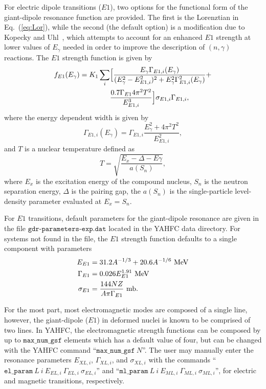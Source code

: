 \documentclass[
10pt,
showpacs,preprintnumbers,footinbib,
amsfonts,amsmath,amssymb,
aps,
prc,twocolumn,groupedaddress,superscriptaddress,
showkeys,
nofootinbib
]{revtex4-1}
\begin{document}
For electric dipole transitions ($E1$), two options for the functional form of the giant-dipole resonance function are provided. The first is the Lorenztian in Eq.~(\ref{eq:Lor}), while the second (the default option) is a modification due to Kopecky and Uhl~\cite{Kopecky:1990}, which attempts to account for an enhanced $E1$ strength at lower values of $E_\gamma$ needed in order to improve  the description of $(n,\gamma)$ reactions. The $E1$ strength function is given by
\begin{align}
f_{E1}(E_\gamma ) = K_1 \sum_i & \Bigl[ \frac{E_\gamma\Gamma_{E1,i}(E_\gamma)}{(E_\gamma^2 - E^2_{E1,i})^2+E^2_\gamma\Gamma^2_{E1,i}(E_\gamma)} +\notag\\
& \frac{0.7\Gamma_{E1}4\pi^2 T^2}{E_{E1,i}^3}\Bigr ]\sigma_{E1,i}\Gamma_{E1,i},
\end{align}
where the energy dependent width is given by
\begin{equation}
\Gamma_{E1,i}(E_\gamma) = \Gamma_{E1,i}\frac{ E_\gamma^2+4\pi^2T^2} {E^2_{E1,i}},
\end{equation} 
and $T$ is a nuclear temperature defined as
\begin{equation}
T = \sqrt{\frac{ E_x -\Delta - E\gamma} {a(S_n)}},
\end{equation}
where $E_x$ is the excitation energy of the compound nucleus, $S_n$ is the neutron separation energy, $\Delta$ is the pairing gap, the $a(S_n)$ is the single-particle level-density parameter evaluated at $E_x=S_n$.

For $E1$ transitions, default parameters for the giant-dipole resonance are given in the file ${\texttt{gdr-parameters-exp.dat}}$ located in the YAHFC data directory. For systems not found in the file, the $E1$ strength function defaults to a single component with parameters
\begin{align}
E_{E1} &= 31.2A^{-1/3} + 20.6A^{-1/6}~{\text{MeV}}  \\ \notag
\Gamma_{E1} &=  0.026E_{E1}^{1.91}~{\text{MeV}} \\ \notag
\sigma_{E1} &= \frac{144 N Z}{A\pi \Gamma_{E1}}~{\text{mb}}. 
\end{align}

For the most part, most electromagnetic modes are composed of a single line, however, the giant-dipole ($E1$) in deformed nuclei is known to be comprised of two lines. In YAHFC, the electromagnetic strength functions can be composed by up to ${\texttt{max\_num\_gsf}}$ elements which has a default value of four, but can be changed with the YAHFC command ``${\texttt{max\_num\_gsf}~N}$''. The user may manually enter the resonance parameters $E_{XL,i}$, $\Gamma_{XL,i}$, and $\sigma_{XL,i}$ with the commands ``${\texttt{el\_param}}~L~i~E_{EL,i}~\Gamma_{EL,i} ~ \sigma_{EL,i }$'' and 
``${\texttt{ml\_param}}~L~i~E_{ML,i}~\Gamma_{ML,i}~\sigma_{ML,i}$'', for electric and magnetic transitions, respectively.
\end{document}
